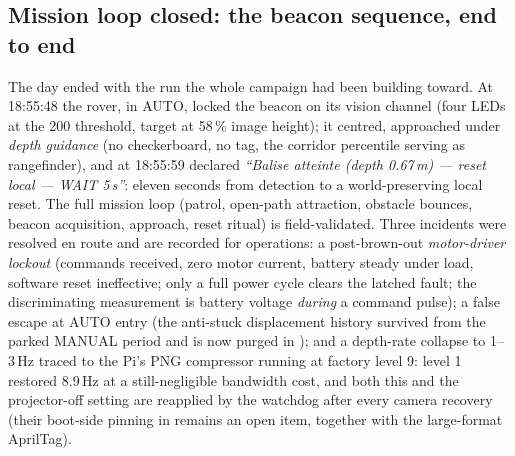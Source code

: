 \subsection{Mission loop closed: the beacon sequence, end to end}
\label{sec:mission-closed}
The day ended with the run the whole campaign had been building toward. At
18:55:48 the rover, in AUTO, locked the beacon on its vision channel (four
LEDs at the 200 threshold, target at 58\,\% image height); it centred,
approached under \emph{depth guidance} (no checkerboard, no tag, the
corridor percentile serving as rangefinder), and at 18:55:59 declared
\emph{``Balise atteinte (depth 0.67\,m) --- reset local --- WAIT 5\,s''}:
eleven seconds from detection to a world-preserving local reset. The full
mission loop (patrol, open-path attraction, obstacle bounces, beacon
acquisition, approach, reset ritual) is field-validated. Three incidents
were resolved en route and are recorded for operations: a post-brown-out
\emph{motor-driver lockout} (commands received, zero motor current, battery
steady under load, software reset ineffective; only a full power cycle
clears the latched fault; the discriminating measurement is battery voltage
\emph{during} a command pulse); a false escape at AUTO entry (the anti-stuck
displacement history survived from the parked MANUAL period and is now
purged in ); and a depth-rate collapse to 1--3\,Hz
traced to the Pi's PNG compressor running at factory level 9: level 1
restored 8.9\,Hz at a still-negligible bandwidth cost, and both this and
the projector-off setting are reapplied by the watchdog after every camera
recovery (their boot-side pinning in  remains an open
item, together with the large-format AprilTag).

